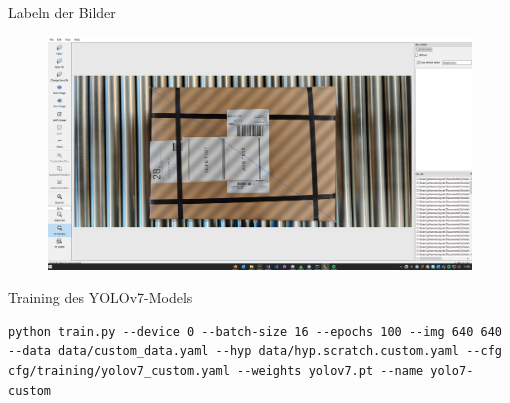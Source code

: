 \documentclass[10pt,ngerman]{beamer}
\begin{document}
\begin{frame}[fragile]{Labeln der Bilder}
  \begin{figure}[htpb]
    \centering
    \includegraphics[width=1\textwidth]{pics/labelImg.png}
  \end{figure}
\end{frame}



\begin{frame}[fragile]{Training des YOLOv7-Models}
  \begin{lstlisting}[style=bash-style,
    breaklines=true]
    python train.py --device 0 --batch-size 16 --epochs 100 --img 640 640 --data data/custom_data.yaml --hyp data/hyp.scratch.custom.yaml --cfg cfg/training/yolov7_custom.yaml --weights yolov7.pt --name yolo7-custom
  \end{lstlisting}
\end{frame}

\end{document}
